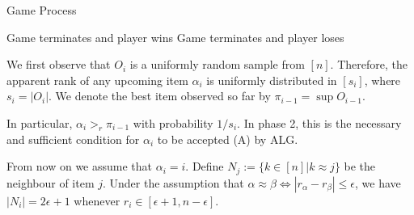 \documentclass{article}
\begin{document}
\begin{algorithm}
\caption{Game Process}
\label{algo1} 
\begin{algorithmic}[1]







			\State Game terminates and player wins
		\Else
			\State Game terminates and player loses
			\EndIf
			
		
	\EndIf
	
	
\EndFor

\end{algorithmic}
\end{algorithm}

\pagebreak

\newcommand{\ALG}{\text{ALG}}
\newcommand{\BestSoFar}{{\pi_{i-1}}}

We first observe that $O_i$ is a uniformly random sample from $[n]$. Therefore, the apparent rank of any upcoming item $\alpha_i$ is uniformly distributed in $[s_i]$, where $s_i = |O_i|$. We denote the best item observed so far by $\BestSoFar = \sup O_{i-1}$.

In particular, $\alpha_i >_r \BestSoFar$ with probability $1/s_i$. In phase 2, this is the necessary and sufficient condition for $\alpha_i$ to be accepted (A) by $\ALG$.

From now on we assume that $\alpha_i = i$. Define $N_j := \{k\in[n] | k \approx j\}$ be the neighbour of item $j$. Under the assumption that $\alpha \approx \beta \iff |r_\alpha - r_\beta|\leq \epsilon$, we have $|N_i|=2 \epsilon + 1$ whenever $r_i \in [\epsilon+1, n-\epsilon]$.
\end{document}
